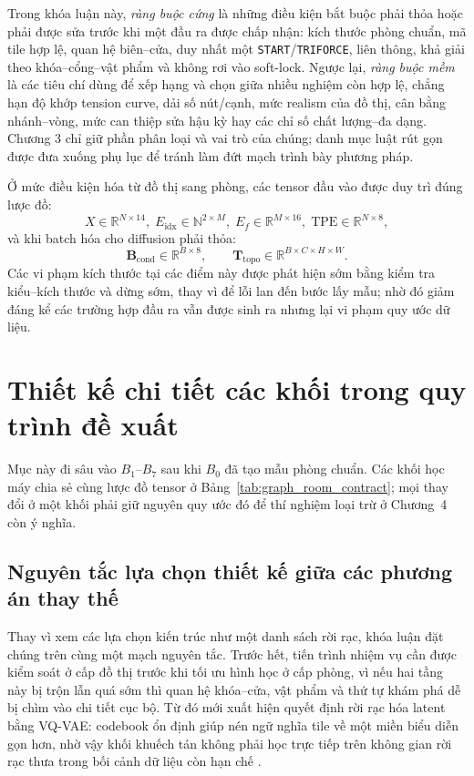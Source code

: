 \documentclass[oneside,a4paper,12pt]{extreport}
\begin{document}
Trong khóa luận này, \emph{ràng buộc cứng} là những điều kiện bắt buộc phải thỏa hoặc phải được sửa trước khi một đầu ra được chấp nhận: kích thước phòng chuẩn, mã tile hợp lệ, quan hệ biên--cửa, duy nhất một \texttt{START}/\texttt{TRIFORCE}, liên thông, khả giải theo khóa--cổng--vật phẩm và không rơi vào soft-lock. Ngược lại, \emph{ràng buộc mềm} là các tiêu chí dùng để xếp hạng và chọn giữa nhiều nghiệm còn hợp lệ, chẳng hạn độ khớp tension curve, dải số nút/cạnh, mức realism của đồ thị, cân bằng nhánh--vòng, mức can thiệp sửa hậu kỳ hay các chỉ số chất lượng--đa dạng. Chương 3 chỉ giữ phần phân loại và vai trò của chúng; danh mục luật rút gọn được đưa xuống phụ lục để tránh làm đứt mạch trình bày phương pháp.

Ở mức điều kiện hóa từ đồ thị sang phòng, các tensor đầu vào được duy trì đúng lược đồ:
\begin{equation}
X\in\mathbb{R}^{N\times 14},\;
E_{\mathrm{idx}}\in\mathbb{N}^{2\times M},\;
E_f\in\mathbb{R}^{M\times 16},\;
\mathrm{TPE}\in\mathbb{R}^{N\times 8},
\end{equation}
và khi batch hóa cho diffusion phải thỏa:
\begin{equation}
\mathbf{B}_{\text{cond}}\in\mathbb{R}^{B\times 8},
\qquad
\mathbf{T}_{\text{topo}}\in\mathbb{R}^{B\times C\times H\times W}.
\end{equation}
Các vi phạm kích thước tại các điểm này được phát hiện sớm bằng kiểm tra kiểu--kích
thước và dừng sớm, thay vì để lỗi lan đến bước lấy mẫu; nhờ đó giảm đáng kể
các trường hợp đầu ra vẫn được sinh ra nhưng lại vi phạm quy ước dữ liệu.

\section{Thiết kế chi tiết các khối trong quy trình đề xuất}

Mục này đi sâu vào $B_1$--$B_7$ sau khi $B_0$ đã tạo mẫu phòng chuẩn. Các khối học máy chia sẻ cùng lược đồ tensor ở Bảng~\ref{tab:graph_room_contract}; mọi thay đổi ở một khối phải giữ nguyên quy ước đó để thí nghiệm loại trừ ở Chương~4 còn ý nghĩa.

\subsection{Nguyên tắc lựa chọn thiết kế giữa các phương án thay thế}
Thay vì xem các lựa chọn kiến trúc như một danh sách rời rạc, khóa luận đặt chúng trên cùng một mạch nguyên tắc. Trước hết, tiến trình nhiệm vụ cần được kiểm soát ở cấp đồ thị trước khi tối ưu hình học ở cấp phòng, vì nếu hai tầng này bị trộn lẫn quá sớm thì quan hệ khóa--cửa, vật phẩm và thứ tự khám phá dễ bị chìm vào chi tiết cục bộ. Từ đó mới xuất hiện quyết định rời rạc hóa latent bằng VQ-VAE: codebook ổn định giúp nén ngữ nghĩa tile về một miền biểu diễn gọn hơn, nhờ vậy khối khuếch tán không phải học trực tiếp trên không gian rời rạc thưa trong bối cảnh dữ liệu còn hạn chế \cite{bishop2006prml,goodfellow2016deeplearning,oord2017vqvae}.
\end{document}
